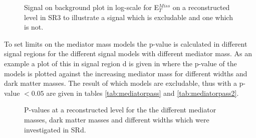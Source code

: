  \begin{figure}[H] %
    \hfill
    \caption{Signal on background plot in log-scale for E$^{Miss}_T$ on a reconstructed level in SR3 to illustrate a signal which is excludable and one which is not. }
    \label{fig:sigback}
  \end{figure}

To set limits on the mediator mass models the p-value is calculated in different signal regions for the different signal models with different mediator mass. As an example a plot of this in signal region d is given in  where the p-value of the models is plotted against the increasing mediator mass for different widths and dark matter masses. The result of which models are excludable, thus with a p-value $<0.05$ are given in tables \ref{tab:mediatorpass} and \ref{tab:mediatorpass2}.

 \begin{figure}[H] %
    \hfill
    \caption{P-values at a reconstructed level for the the different mediator masses, dark matter masses and different widths which were investigated in SRd.}
    \label{fig:modelex}
  \end{figure}




